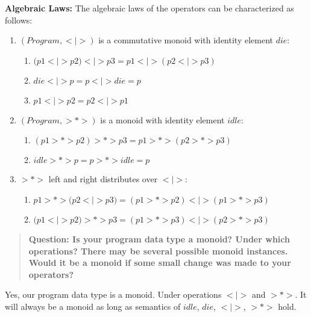 \documentclass[10pt]{article}
\begin{document}
\textbf{Algebraic Laws:} The algebraic laws of the operators can be characterized as follows:
\begin{enumerate}
\item $(Program, <|>)$ is a commutative monoid with identity element $die$:
	\begin{enumerate}
	\item $(p1 <|> p2) <|> p3 = p1 <|> (p2 <|> p3)$
	\item $die <|> p = p <|> die = p$
	\item $p1 <|> p2 = p2 <|> p1$
	\end{enumerate}
\item $(Program, >*>)$ is a monoid with identity element $idle$:
	\begin{enumerate}
	\item $(p1 >*> p2) >*> p3 = p1 >*> (p2 >*> p3)$
	\item $idle >*> p = p >*> idle = p$
	\end{enumerate}
\item $>*>$ left and right distributes over $<|>$:
	\begin{enumerate}
	\item $p1 >*> (p2 <|> p3) = (p1 >*> p2) <|> (p1 >*> p3)$
	\item $(p1 <|> p2) >*> p3 = (p1 >*> p3) <|> (p2 >*> p3)$
	\end{enumerate}
\end{enumerate}

\begin{quote}
\textbf{Question: Is your program data type a monoid? Under which operations? There may be several possible monoid instances. Would it be a monoid if some small change was made to your operators?}
\end{quote}
Yes, our program data type is a monoid. Under operations $<|>$ and $>*>$. It will always be a monoid as long as semantics of $idle$, $die$, $<|>$, $>*>$ hold.
\end{document}
